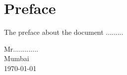 \chapter*{Preface}
The preface about the document ......... 
\begin{flushleft}
Mr.............\\Mumbai \\ \today
\end{flushleft}





